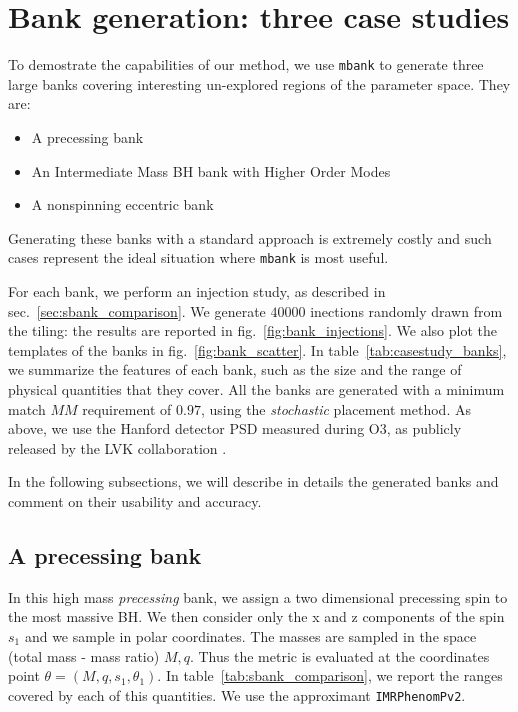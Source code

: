 \documentclass[twocolumn,showpacs,preprintnumbers,nofootinbib,prd,
superscriptaddress,10pt]{revtex4-2}
\newcommand{\mbank}{\texttt{mbank} }
\begin{document}

\section{Bank generation: three case studies} \label{sec:bank_generation}

To demostrate the capabilities of our method, we use \mbank to generate three large banks covering interesting un-explored regions of the parameter space.
They are:
	\begin{itemize}
		\item A precessing bank
		\item An Intermediate Mass BH bank with Higher Order Modes
		\item A nonspinning eccentric bank
	\end{itemize}
Generating these banks with a standard approach is extremely costly and such cases represent the ideal situation where \mbank is most useful.

For each bank, we perform an injection study, as described in sec.~\ref{sec:sbank_comparison}. We generate $40000$ inections randomly drawn from the tiling: the results are reported in fig.~\ref{fig:bank_injections}. We also plot the templates of the banks in fig.~\ref{fig:bank_scatter}.
In table~\ref{tab:casestudy_banks}, we summarize the features of each bank, such as the size and the range of physical quantities that they cover.
All the banks are generated with a minimum match $MM$ requirement of $0.97$, using the {\it stochastic} placement method.
As above, we use the Hanford detector PSD measured during O3, as publicly released by the LVK collaboration \cite{https://dcc.ligo.org/LIGO-T2000012/public}.

In the following subsections, we will describe in details the generated banks and comment on their usability and accuracy.

\subsection{A precessing bank}\label{sec:precessing_bank}
	
In this high mass {\it precessing} bank, we assign a two dimensional precessing spin to the most massive BH. We then consider only the x and z components of the spin $s_1$ and we sample in polar coordinates. The masses are sampled in the space (total mass - mass ratio) $M,q$.  Thus the metric is evaluated at the coordinates point $\theta = (M, q, s_1, \theta_1)$. In table~\ref{tab:sbank_comparison}, we report the ranges covered by each of this quantities. We use the approximant \texttt{IMRPhenomPv2}.
\end{document}
